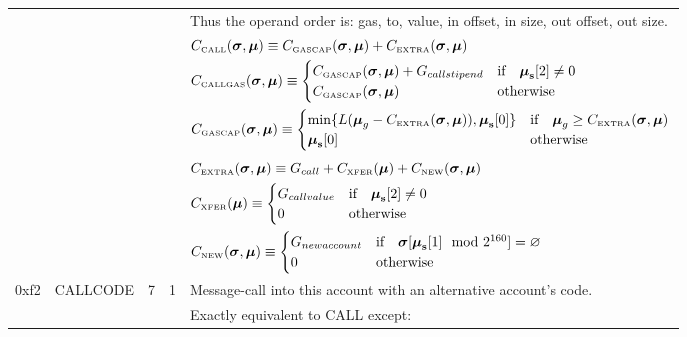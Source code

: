 \documentclass[9pt,oneside]{amsart}
\begin{document}
\begin{tabular*}{\columnwidth}[h]{rlrrl}
&&&& Thus the operand order is: gas, to, value, in offset, in size, out offset, out size. \\
&&&& $C_{\text{\tiny CALL}}(\boldsymbol{\sigma}, \boldsymbol{\mu}) \equiv C_{\text{\tiny GASCAP}}(\boldsymbol{\sigma}, \boldsymbol{\mu}) + C_{\text{\tiny EXTRA}}(\boldsymbol{\sigma}, \boldsymbol{\mu})$ \\
&&&& $C_{\text{\tiny CALLGAS}}(\boldsymbol{\sigma}, \boldsymbol{\mu}) \equiv  \begin{cases}
C_{\text{\tiny GASCAP}}(\boldsymbol{\sigma}, \boldsymbol{\mu}) + G_{callstipend} & \text{if} \quad \boldsymbol{\mu}_\mathbf{s}[2] \neq 0 \\
C_{\text{\tiny GASCAP}}(\boldsymbol{\sigma}, \boldsymbol{\mu}) & \text{otherwise}
\end{cases}$ \\
&&&& $C_{\text{\tiny GASCAP}}(\boldsymbol{\sigma}, \boldsymbol{\mu}) \equiv \begin{cases}
\min\{ L(\boldsymbol{\mu}_g - C_{\text{\tiny EXTRA}}(\boldsymbol{\sigma}, \boldsymbol{\mu})), \boldsymbol{\mu}_{\mathbf{s}}[0] \} & \text{if} \quad \boldsymbol{\mu}_g \ge C_{\text{\tiny EXTRA}}(\boldsymbol{\sigma}, \boldsymbol{\mu})\\
\boldsymbol{\mu}_{\mathbf{s}}[0] & \text{otherwise}
\end{cases}$\\
&&&& $C_{\text{\tiny EXTRA}}(\boldsymbol{\sigma}, \boldsymbol{\mu}) \equiv G_{call} + C_{\text{\tiny XFER}}(\boldsymbol{\mu}) + C_{\text{\tiny NEW}}(\boldsymbol{\sigma}, \boldsymbol{\mu})$\\
&&&& $C_{\text{\tiny XFER}}(\boldsymbol{\mu}) \equiv \begin{cases}
G_{callvalue} & \text{if} \quad \boldsymbol{\mu}_\mathbf{s}[2] \neq 0 \\
0 & \text{otherwise}
\end{cases}$ \\
&&&& $C_{\text{\tiny NEW}}(\boldsymbol{\sigma}, \boldsymbol{\mu}) \equiv \begin{cases}
G_{newaccount} & \text{if} \quad \boldsymbol{\sigma}[\boldsymbol{\mu}_\mathbf{s}[1] \mod 2^{160}] = \varnothing \\
0 & \text{otherwise}
\end{cases}$ \\
\midrule
0xf2 & {\small CALLCODE} & 7 & 1 & Message-call into this account with an alternative account's code. \\
&&&& Exactly equivalent to {\small CALL} except: \\

\end{tabular*}
\end{document}
